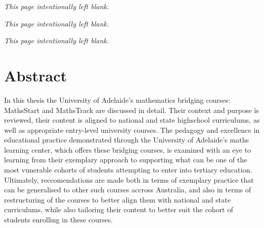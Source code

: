 \documentclass[twoside,12pt,a4paper]{report}
\makeatletter
\newcommand*{\intentionallyblankpage}{
  \vspace*{\fill}
  {\centering \textit{This page intentionally left blank.} \par}
  \vspace{\fill}}
\renewcommand*{\cleardoublepage}{\clearpage\if@twoside \ifodd\c@page\else
  \intentionallyblankpage
  \newpage
  \if@twocolumn\hbox{}\newpage\fi\fi\fi}
\makeatother
\begin{document}



\setcounter{page}{2}
\intentionallyblankpage
\newpage
\intentionallyblankpage
\tableofcontents
{}



\glsaddall
\printglossaries
{}



\glsresetall
\cleardoublepage
\chapter*{Abstract}

In this thesis the University of Adelaide's mathematics bridging courses: MathsStart and MathsTrack are discussed in detail. Their context and purpose is reviewed, their content is aligned to national and state highschool curriculums, as well as appropriate entry-level university courses. The pedagogy and excellence in educational practice demonstrated through the University of Adelaide's maths learning center, which offers these bridging courses, is examined with an eye to learning from their exemplary approach to supporting what can be one of the most vunerable cohorts of students attempting to enter into tertiary education. Ultimately, reccomendations are made both in terms of exemplary practice that can be generalised to other such courses accross Australia, and also in terms of restructuring of the courses to better align them with national and state curriculums, while also tailoring their content to better suit the cohort of students enrolling in these courses.




% 
\end{document}
